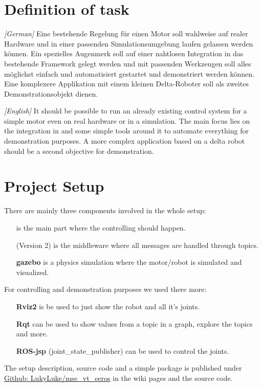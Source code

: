 
\section[Definition of task]{Definition of task} \label{sec:definition-of-task}

\textit{[German]} Eine bestehende Regelung f\"ur einen Motor soll wahlweise auf realer Hardware und in einer passenden Simulationsumgebung laufen gelassen werden k\"onnen.
Ein spezielles Augenmerk soll auf einer nahtlosen Integration in das bestehende  Framework gelegt werden und mit passenden Werkzeugen soll alles m\"oglichst einfach und automatisiert gestartet und demonstriert werden k\"onnen.
Eine komplexere Applikation mit einem kleinen Delta-Roboter soll als zweites Demonstrationsobjekt dienen.

\textit{[English]} It should be possible to run an already existing control system for a simple motor even on real hardware or in a simulation.
The main focus lies on the integration in  and some simple tools around it to automate everything for demonstration purposes.
A more complex application based on a delta robot should be a second objective for demonstration.


\section[Setup]{Project Setup} \label{sec:project-setup}

There are mainly three components involved in the whole setup:

\begin{itemize}
    \item[\textbf{\GLS{eeros}}] is the main part where the controlling should happen.
    \item[\textbf{\GLS{ros}}] (Version 2) is the middleware where all messages are handled through topics.
    \item[\textbf{\Gls{gazebo}}] is a physics simulation where the motor/robot is simulated and visualized.
\end{itemize}

For controlling and demonstration purposes we used there more:

\begin{itemize}
    \item[\textbf{Rviz2}] is be used to just show the robot and all it's joints.
    \item[\textbf{Rqt}] can be used to show values from a topic in a graph, explore the topics and more.
    \item[\textbf{ROS-jsp}] (joint\_state\_publisher) can be used to control the joints.
\end{itemize}

The setup description, source code and a simple package is published under \href{https://github.com/LukyLuke/mse_vt_eeros}{Github: LukyLuke/mse\_vt\_eeros} in the wiki pages and the source code.
